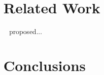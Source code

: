 \documentclass[11pt,letterpaper]{article}
\newcommand{\baseline}{{\sc Baseline}}
\begin{document}


\section{Related Work}
\label{sec:relatedWork}

~ proposed...

\section{Conclusions}






\end{document}
